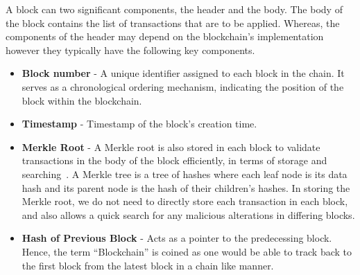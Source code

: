 \noindent A block can two significant components, the header and the body. The body of the block contains the list of transactions that are to be applied. Whereas, the components of the header may depend on the blockchain's implementation however they typically have the following key components.
\begin{itemize}
    \item \textbf{Block number} - A unique identifier assigned to each block in the chain. It serves as a chronological ordering mechanism, indicating the position of the block within the blockchain.
    \item \textbf{Timestamp} - Timestamp of the block's creation time.
    \item \textbf{Merkle Root} - A Merkle root is also stored in each block to validate transactions in the body of the block efficiently, in terms of storage and searching~\cite{noauthor_merkle_nodate}. A Merkle tree is a tree of hashes where each leaf node is its data hash and its parent node is the hash of their children's hashes. In storing the Merkle root, we do not need to directly store each transaction in each block, and also allows a quick search for any malicious alterations in differing blocks.
    \item \textbf{Hash of Previous Block} - Acts as a pointer to the predecessing block. Hence, the term ``Blockchain'' is coined as one would be able to track back to the first block from the latest block in a chain like manner.
\end{itemize}

